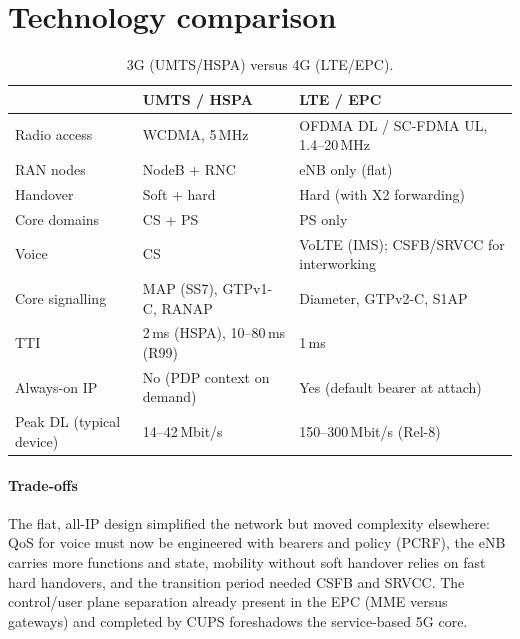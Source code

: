 \documentclass[11pt,a4paper]{article}
\begin{document}
\section{Technology comparison}
\begin{table}[htbp]
\centering\small
\caption{3G (UMTS/HSPA) versus 4G (LTE/EPC).}\label{tab:3g4g}
\begin{tabularx}{\linewidth}{@{}l Y Y@{}}
\toprule
{} & UMTS / HSPA & LTE / EPC \\
\midrule
Radio access          & WCDMA, 5\,MHz                     & OFDMA DL / SC-FDMA UL, 1.4--20\,MHz \\
RAN nodes             & NodeB + RNC                        & eNB only (flat) \\
Handover              & Soft + hard                        & Hard (with X2 forwarding) \\
Core domains          & CS + PS                            & PS only \\
Voice                 & CS                                 & VoLTE (IMS); CSFB/SRVCC for interworking \\
Core signalling       & MAP (SS7), GTPv1-C, RANAP          & Diameter, GTPv2-C, S1AP \\
TTI                   & 2\,ms (HSPA), 10--80\,ms (R99)     & 1\,ms \\
Always-on IP          & No (PDP context on demand)          & Yes (default bearer at attach) \\
Peak DL (typical device) & 14--42\,Mbit/s                  & 150--300\,Mbit/s (Rel-8) \\
\bottomrule
\end{tabularx}
\end{table}

\paragraph{Trade-offs} The flat, all-IP design simplified the network but moved complexity
elsewhere: QoS for voice must now be engineered with bearers and policy (PCRF), the eNB carries
more functions and state, mobility without soft handover relies on fast hard handovers, and the
transition period needed CSFB and SRVCC. The control/user plane separation already present in
the EPC (MME versus gateways) and completed by CUPS foreshadows the service-based 5G core.

\end{document}
